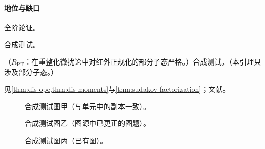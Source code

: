 \paragraph{地位与缺口}全阶论证。

\begin{example}[节标签依赖]\label{ex:dis-seclabel}
合成测试。
\end{example}

\begin{lemma}\label{lem:dis-hidden}
（$R_{\mathrm{PT}}$：在重整化微扰论中对红外正规化的部分子态严格。）合成测试。（本引理只涉及部分子态。）
\end{lemma}

见\cref{thm:dis-ope,thm:dis-moments}与\cref{thm:sudakov-factorization}；文献\cite{Synth:2026abc,NoSuchKey2099}。

\begin{figure}[htbp]
\centering
{}
\caption{合成测试图甲（与单元中的副本一致）。}\label{fig:synth-same}
\end{figure}

\begin{figure}[htbp]
\centering
{}
\caption{合成测试图乙（图源中已更正的图题）。}\label{fig:synth-changed}
\end{figure}

\begin{figure}[htbp]
\centering
{}
\caption{合成测试图丙（已有图）。}\label{fig:synth-existing}
\end{figure}
